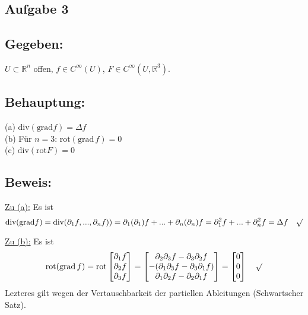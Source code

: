\documentclass[a4paper, 12pt]{article} %
\begin{document}
\begin{flushleft}
        \QEDB

        \section*{Aufgabe 3}

        \subsection*{Gegeben:}
        $U \subset \mathbb{R}^n$ offen, $f \in C^\infty(U)$, $F \in C^\infty(U, \mathbb{R}^3)$.

        \subsection*{Behauptung:}
        (a) $\text{div} (\text{grad} f) = \Delta f$\\
        (b) Für $n=3$: $\text{rot} ( \text{grad} \, f) = 0$\\
        (c) $\text{div}(\text{rot}F) = 0$

        \subsection*{Beweis:}
        \underline{Zu (a):} Es ist
        $$
        \text{div} (\text{grad} f)
            = \text{div} (\partial_1 f,..., \partial_n f) )
            = \partial_1(\partial_1)f + ... + \partial_n(\partial_n)f 
            = \partial^2_1 f + ... + \partial^2_n f = \Delta f  \quad \surd
        $$

        \underline{Zu (b):} Es ist
        $$
        \text{rot} ( \text{grad} \, f) 
            = \text{rot} \begin{bmatrix}
                \partial_1 f \\
                \partial_2 f \\
                \partial_3 f
              \end{bmatrix}
            = \begin{bmatrix}
                \partial_2 \partial_3 f - \partial_3 \partial_2 f \\
                - ( \partial_1 \partial_3 f - \partial_3 \partial_1 f ) \\
                \partial_1 \partial_2 f - \partial_2 \partial_1 f 
              \end{bmatrix}
            = \begin{bmatrix}
                0 \\
                0 \\
                0 
              \end{bmatrix}  \quad \surd
        $$
        Lezteres gilt wegen der Vertauschbarkeit der partiellen Ableitungen 
        (Schwartscher Satz).





    \end{flushleft}
\end{document}
